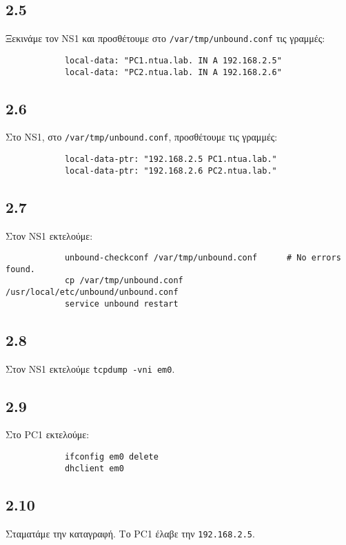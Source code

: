 \documentclass[a4paper, 12pt]{article}
\begin{document}
	\subsection*{2.5} 
		Ξεκινάμε τον NS1 και προσθέτουμε στο \verb|/var/tmp/unbound.conf| τις γραμμές:
		
		\begin{verbatim}
			local-data: "PC1.ntua.lab. IN A 192.168.2.5"
			local-data: "PC2.ntua.lab. IN A 192.168.2.6"
		\end{verbatim}

	\subsection*{2.6}
		Στο NS1, στο \verb|/var/tmp/unbound.conf|, προσθέτουμε τις γραμμές:
		
		\begin{verbatim}
			local-data-ptr: "192.168.2.5 PC1.ntua.lab."
			local-data-ptr: "192.168.2.6 PC2.ntua.lab."			
		\end{verbatim}

	\subsection*{2.7}
		Στον NS1 εκτελούμε:
		
		\begin{verbatim}
			unbound-checkconf /var/tmp/unbound.conf      # No errors found.
			cp /var/tmp/unbound.conf /usr/local/etc/unbound/unbound.conf
			service unbound restart
		\end{verbatim}

	\subsection*{2.8}
		Στον NS1 εκτελούμε \verb|tcpdump -vni em0|.

	\subsection*{2.9}
		Στο PC1 εκτελούμε:
		
		\begin{verbatim}
			ifconfig em0 delete
			dhclient em0
		\end{verbatim}

	\subsection*{2.10}
		Σταματάμε την καταγραφή. Το PC1 έλαβε την \verb|192.168.2.5|.
\end{document}
